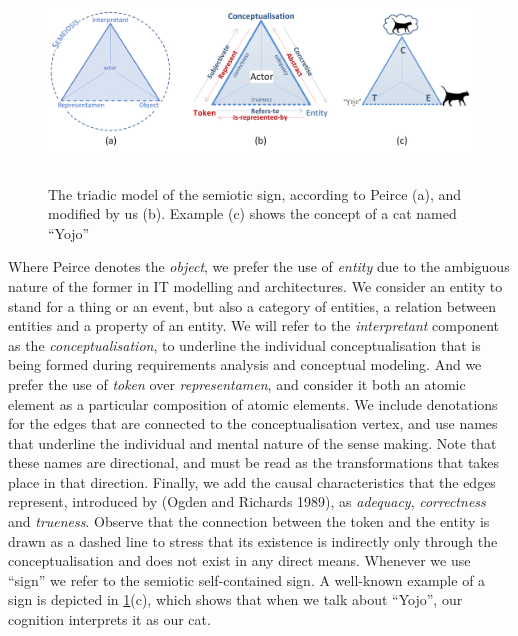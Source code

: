 \documentclass[a4paper,11pt,oneside,oldfontcommands]{memoir}
\theoremstyle{definition}
\theoremstyle{break}		%
\numberwithin{equation}{chapter}
\numberwithin{figure}{chapter}
\begin{document}
\begin{figure}
\hypertarget{fig:semiotic-triangles}{%
\centering
\includegraphics[width=6.25in,height=2.08333in]{./tex2pdf.9980/1d52e69a092840696e68cfe7d8fce2e0b93e3240.png}
\caption{The triadic model of the semiotic sign, according to Peirce
(a), and modified by us (b). Example (c) shows the concept of a cat
named ``Yojo''}\label{fig:semiotic-triangles}
}
\end{figure}

Where Peirce denotes the \emph{object}, we prefer the use of
\emph{entity} due to the ambiguous nature of the former in IT modelling
and architectures. We consider an entity to stand for a thing or an
event, but also a category of entities, a relation between entities and
a property of an entity. We will refer to the \emph{interpretant}
component as the \emph{conceptualisation}, to underline the individual
conceptualisation that is being formed during requirements analysis and
conceptual modeling. And we prefer the use of \emph{token} over
\emph{representamen}, and consider it both an atomic element as a
particular composition of atomic elements. We include denotations for
the edges that are connected to the conceptualisation vertex, and use
names that underline the individual and mental nature of the sense
making. Note that these names are directional, and must be read as the
transformations that takes place in that direction. Finally, we add the
causal characteristics that the edges represent, introduced by (Ogden
and Richards 1989), as \emph{adequacy}, \emph{correctness} and
\emph{trueness}. Observe that the connection between the token and the
entity is drawn as a dashed line to stress that its existence is
indirectly only through the conceptualisation and does not exist in any
direct means. Whenever we use ``sign'' we refer to the semiotic
self-contained sign. A well-known example of a sign is depicted in
\cref{fig:semiotic-triangles}(c), which shows that when we talk about
``Yojo'', our cognition interprets it as our cat.
\end{document}
